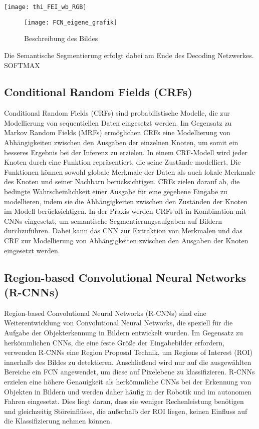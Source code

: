 \texttt{[image: thi\_FEI\_wb\_RGB]}

\begin{figure}
    \centering
    \texttt{[image: FCN\_eigene\_grafik]}
    \caption{Beschreibung des Bildes}
    \label{fig:bildlabel}
\end{figure}
Die Semantische
Segmentierung erfolgt dabei am Ende des Decoding Netzwerkes. \cite{7803544}
SOFTMAX

\subsection{Conditional Random Fields (CRFs)}
Conditional Random Fields (CRFs) sind probabilistische Modelle, die zur
Modellierung von sequentiellen Daten eingesetzt werden. Im Gegensatz zu Markov
Random Fields (MRFs) ermöglichen CRFs eine Modellierung von Abhängigkeiten
zwischen den Ausgaben der einzelnen Knoten, um somit ein besseres Ergebnis bei
der Inferenz zu erzielen. In einem CRF-Modell wird jeder Knoten durch eine
Funktion repräsentiert, die seine Zustände modelliert. Die Funktionen können
sowohl globale Merkmale der Daten als auch lokale Merkmale des Knoten und
seiner Nachbarn berücksichtigen. CRFs zielen darauf ab, die bedingte
Wahrscheinlichkeit einer Ausgabe für eine gegebene Eingabe zu modellieren,
indem sie die Abhängigkeiten zwischen den Zuständen der Knoten im Modell
berücksichtigen. In der Praxis werden CRFs oft in Kombination mit CNNs
eingesetzt, um semantische Segmentierungsaufgaben auf Bildern durchzuführen.
Dabei kann das CNN zur Extraktion von Merkmalen und das CRF zur Modellierung
von Abhängigkeiten zwischen den Ausgaben der Knoten eingesetzt werden.

\subsection{Region-based Convolutional Neural Networks (R-CNNs)}
Region-based Convolutional Neural Networks (R-CNNs) sind eine Weiterentwicklung
von Convolutional Neural Networks, die speziell für die Aufgabe der
Objekterkennung in Bildern entwickelt wurden. Im Gegensatz zu herkömmlichen
CNNs, die eine feste Größe der Eingabebilder erfordern, verwenden R-CNNs eine
Region Proposal Technik, um Regions of Interest (ROI) innerhalb des Bildes zu
detektieren. Anschließend wird nur auf die ausgewählten Bereiche ein FCN
angewendet, um diese auf Pixelebene zu klassifizieren. R-CNNs erzielen eine
höhere Genauigkeit als herkömmliche CNNs bei der Erkennung von Objekten in
Bildern und werden daher häufig in der Robotik und im autonomen Fahren
eingesetzt. Dies liegt daran, dass sie weniger Rechenleistung benötigen und
gleichzeitig Störeinflüsse, die außerhalb der ROI liegen, keinen Einfluss auf
die Klassifizierung nehmen können. \cite{8237584}

